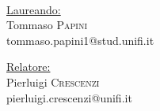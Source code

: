 

\makeatletter
    \patchcmd{\chapter}{\if@openright\cleardoublepage\else\clearpage\fi}{}{}{}
\makeatother



    
    	\frenchspacing
    	\raggedbottom
    	
    	\begin{center}
    		\large
    		\begingroup
    			\spacedallcaps{\myUni}\\
    			\myFaculty \\
    			\myDegree \\
    			\myTime
    		\endgroup \\
    		\vspace{0.5cm}
    		\begingroup
    			\color{Maroon}\spacedallcaps{\myTitle}\\
    			\spacedlowsmallcaps{\mySubtitle}\\
    			\bigskip
    		\endgroup
    	\end{center}
       	\begin{minipage}{0.5\textwidth}
       		\begin{flushleft}
       			\large \underline{Laureando:}\\
       			\normalsize Tommaso \textsc{Papini}\\
       			tommaso.papini1@stud.unifi.it
       		\end{flushleft}
       	\end{minipage}
       	\begin{minipage}{0.5\textwidth}
       		\begin{flushright}
       			\large \underline{Relatore:}\\
       			\normalsize Pierluigi \textsc{Crescenzi}\\
       			pierluigi.crescenzi@unifi.it
       		\end{flushright}
       	\end{minipage}
    

